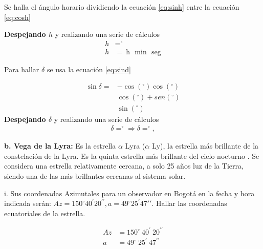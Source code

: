 \begin{multicols}{2}
   Se halla el ángulo horario dividiendo la ecuación \ref{eq:sinh} entre la ecuación \ref{eq:cosh}
   
   
   
   \textbf{Despejando $h$} y realizando una serie de cálculos
   \begin{align}
   h &= ^{\circ} \\
   h &=  ~ \mathrm{h}~~ ~ \mathrm{min}~~ ~ \mathrm{seg} 
   \end{align}
   
   
   Para hallar  $\delta$ se usa la ecuación \ref{eq:sind}
   
   \begin{align*}
   \sin \delta= & - \cos (^{\circ}) \cos (^{\circ})\\
   & \cos (^{\circ}) + sen(^{\circ})\\ 
   & \sin (^{\circ})
   \end{align*}
   \textbf{Despejando $\delta$ }y realizando una serie de cálculos
   \begin{align}
   \delta =  ^{\circ}  \Longrightarrow
   \delta = ^{\circ}, 
   \end{align}
   
   \textbf{b. Vega de la Lyra:} Es la estrella $\alpha$  Lyra ($\alpha$  Ly), la estrella más brillante de la constelación de la Lyra. Es la quinta estrella más brillante del cielo nocturno . Se considera una estrella relativamente cercana, a solo 25 años luz de la Tierra, siendo una de las más brillantes cercanas al sistema solar.
   
   i. Sus coordenadas Azimutales para un observador en Bogotá en la fecha y hora indicada serán:
   $Az = 150^{\circ} 40^{\prime} 20^{\prime \prime}, a = 49^{\circ} 25^{\prime} 47{\prime \prime} $. Hallar las coordenadas ecuatoriales de la estrella.
   
   \begin{align}
   Az &= 150^{\circ}~ 40^{\prime}~ 20^{\prime \prime} \\
   a &= 49^{\circ}~ 25^{\prime}~ 47^{\prime \prime}
   \end{align}
   

\end{multicols}

